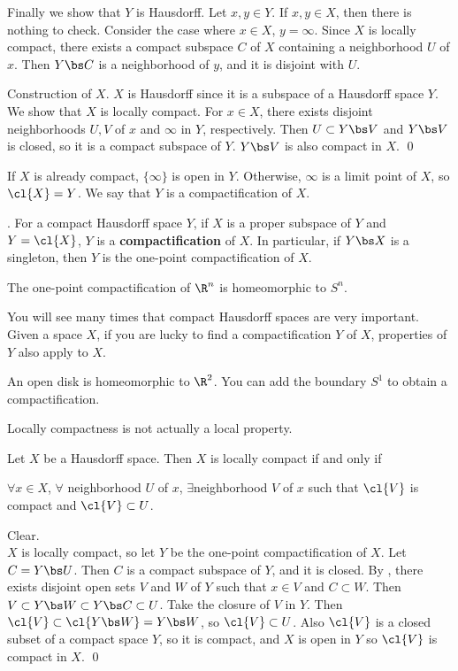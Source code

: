 Finally we show that \(Y\) is Hausdorff. Let \(x, y \in Y\). If \(x, y \in X\), then there is nothing to check. Consider the case where \(x \in X\), \(y = \infty\). Since \(X\) is locally compact, there exists a compact subspace \(C\) of \(X\) containing a neighborhood \(U\) of \(x\). Then \(Y \bs C\) is a neighborhood of \(y\), and it is disjoint with \(U\).

 \note{\mimpd} Construction of \(X\).
\(X\) is Hausdorff since it is a subspace of a Hausdorff space \(Y\). We show that \(X\) is locally compact. For \(x \in X\), there exists disjoint neighborhoods \(U, V\) of \(x\) and \(\infty\) in \(Y\), respectively. Then \(U \subset Y \bs V\) and \(Y \bs V\) is closed, so it is a compact subspace of \(Y\). \(Y \bs V\) is also compact in \(X\). \qed

\pagebreak

\rmk If \(X\) is already compact, \(\{\infty\}\) is open in \(Y\). Otherwise, \(\infty\) is a limit point of \(X\), so \(\cl{X} = Y\). We say that \(Y\) is a compactification of \(X\).

.  For a compact Hausdorff space \(Y\), if \(X\) is a proper subspace of \(Y\) and \(Y = \cl{X}\), \(Y\) is a \textbf{compactification} of \(X\). In particular, if \(Y \bs X\) is a singleton, then \(Y\) is the one-point compactification of \(X\).

\rmk The one-point compactification of \(\R^n\) is homeomorphic to \(S^n\).

You will see many times that compact Hausdorff spaces are very important. Given a space \(X\), if you are lucky to find a compactification \(Y\) of \(X\), properties of \(Y\) also apply to \(X\).

An open disk is homeomorphic to \(\R^2\). You can add the boundary \(S^1\) to obtain a compactification.

Locally compactness is not actually a local property.

 Let \(X\) be a Hausdorff space. Then \(X\) is locally compact if and only if
\begin{center}
    \(\forall x\in X\), \(\forall\) neighborhood \(U\) of \(x\), \(\exists\)neighborhood \(V\) of \(x\) such that \(\cl{V}\) is compact and \(\cl{V} \subset U\).
\end{center}

\pf \note{\mimpd} Clear. \\
\note{\mimp} \(X\) is locally compact, so let \(Y\) be the one-point compactification of \(X\). Let \(C = Y \bs U\). Then \(C\) is a compact subspace of \(Y\), and it is closed. By , there exists disjoint open sets \(V\) and \(W\) of \(Y\) such that \(x \in V\) and \(C \subset W\). Then \(V \subset Y \bs W \subset Y \bs C \subset U\). Take the closure of \(V\) in \(Y\). Then \(\cl{V} \subset \cl{Y \bs W} = Y \bs W\), so \(\cl{V} \subset U\). Also \(\cl{V}\) is a closed subset of a compact space \(Y\), so it is compact, and \(X\) is open in \(Y\) so \(\cl{V}\) is compact in \(X\). \qed

